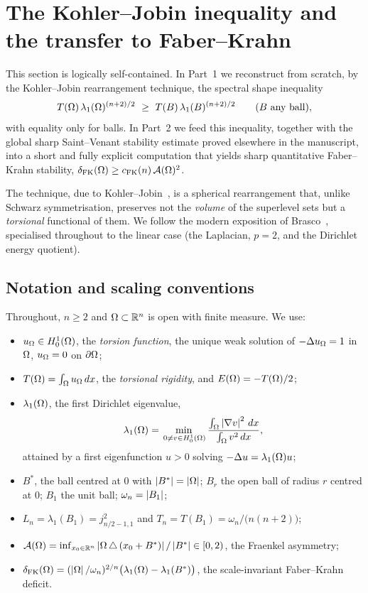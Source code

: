 
\section{The Kohler--Jobin inequality and the transfer to Faber--Krahn}
\label{sec:kj}

This section is logically self-contained. In Part~1 we reconstruct from
scratch, by the Kohler--Jobin rearrangement technique, the spectral shape
inequality
\[
  T(\Om)\,\lambda_1(\Om)^{(n+2)/2}\ \ge\ T(B)\,\lambda_1(B)^{(n+2)/2}
  \qquad(B\text{ any ball}),
\]
with equality only for balls. In Part~2 we feed this inequality, together
with the global sharp Saint--Venant stability estimate proved elsewhere in
the manuscript, into a short and fully explicit computation that yields
sharp quantitative Faber--Krahn stability,
$\delta_{\mathrm{FK}}(\Omega)\ge c_{\mathrm{FK}}(n)\,\mathcal A(\Omega)^2$.

The technique, due to Kohler--Jobin~\cite{KJ1,KJ2,KJ3}, is a spherical
rearrangement that, unlike Schwarz symmetrisation, preserves not the
\emph{volume} of the superlevel sets but a \emph{torsional} functional of
them. We follow the modern exposition of Brasco~\cite[\S\S3--5,
Thm.~1.1]{Brasco2014}, specialised throughout to the linear case (the
Laplacian, $p=2$, and the Dirichlet energy quotient).

\subsection{Notation and scaling conventions}
\label{ssec:kj-notation}

Throughout, $n\ge 2$ and $\Omega\subset\mathbb R^n$ is open with finite measure. We
use:
\begin{itemize}
\item $u_\Omega\in H^1_0(\Omega)$, the \emph{torsion function}, the unique weak
solution of $-\Delta u_\Omega=1$ in $\Omega$, $u_\Omega=0$ on $\partial\Omega$;
\item $T(\Omega)=\int_\Omega u_\Omega\,dx$, the \emph{torsional rigidity}, and
$E(\Omega)=-T(\Omega)/2$;
\item $\lambda_1(\Omega)$, the first Dirichlet eigenvalue,
\begin{equation}\label{eq:rayleigh}
  \lambda_1(\Omega)=\min_{\,0\ne v\in H^1_0(\Omega)}
  \frac{\int_\Omega\left|\nabla v\right|^2\,dx}{\int_\Omega v^2\,dx},
\end{equation}
attained by a first eigenfunction $u>0$ solving $-\Delta u=\lambda_1(\Omega)u$;
\item $B^*$, the ball centred at $0$ with $\left|B^*\right|=\left|\Omega\right|$; $B_r$ the
open ball of radius $r$ centred at $0$; $B_1$ the unit ball;
$\omega_n=\left|B_1\right|$;
\item $L_n=\lambda_1(B_1)=j_{n/2-1,1}^2$ and
$T_n=T(B_1)=\omega_n/\bigl(n(n+2)\bigr)$;
\item $\mathcal A(\Omega)=\inf_{x_0\in\mathbb R^n}\left|\Omega\,\triangle\,(x_0+B^*)\right|/\left|B^*\right|
\in[0,2)$, the Fraenkel asymmetry;
\item $\delta_{\mathrm{FK}}(\Omega)
=(\left|\Omega\right|/\omega_n)^{2/n}\bigl(\lambda_1(\Omega)-\lambda_1(B^*)\bigr)$, the
scale-invariant Faber--Krahn deficit.
\end{itemize}

